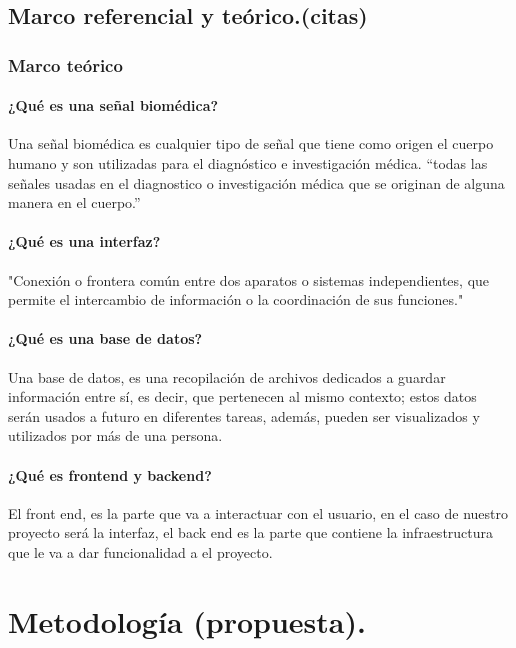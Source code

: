 \documentclass[14pt]{report}
\begin{document}
		\subsection*{Marco referencial y teórico.(citas)}
		\subsubsection{Marco teórico}
		\paragraph{¿Qué es una señal biomédica?} Una señal biomédica es cualquier tipo de señal que tiene como origen el cuerpo humano y son utilizadas para el diagnóstico e investigación médica. 
		“todas las señales usadas en el diagnostico o 
		investigación médica que se originan de alguna manera en 
		el cuerpo.” \cite{monografias}
		\paragraph{¿Qué es una interfaz?} "Conexión o frontera común entre dos aparatos o sistemas independientes, que permite el intercambio de información o la coordinación de sus funciones." \cite{rae_interfaz}
		\paragraph{¿Qué es una base de datos?} Una base de datos, es una recopilación de archivos dedicados a guardar información entre sí, es decir, que pertenecen al mismo contexto; estos datos serán usados a futuro en diferentes tareas, además, pueden ser visualizados y utilizados por más de una persona. \cite{unam}
		\paragraph{¿Qué es frontend y backend?} El front end, es la parte que va a interactuar con el usuario, en el caso de nuestro proyecto será la interfaz, el back end es la parte que contiene la infraestructura que le va a dar funcionalidad a el proyecto. \cite{FrontendBackend}
		
	\section{Metodología (propuesta).}
	\printbibliography
\begin{abstract}
\end{abstract}
\end{document}
